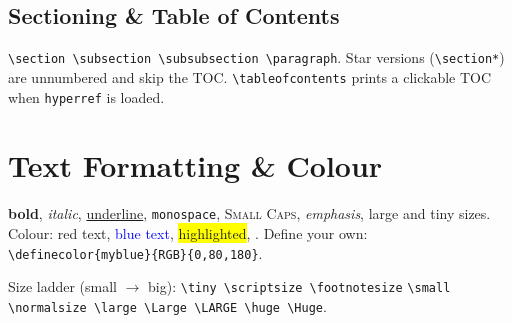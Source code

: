 \documentclass[11pt]{article}
\theoremstyle{plain}
\theoremstyle{definition}
\theoremstyle{remark}
\begin{document}
\subsection{Sectioning \& Table of Contents}
\verb|\section \subsection \subsubsection \paragraph|. Star versions
(\verb|\section*|) are unnumbered and skip the TOC. \verb|\tableofcontents|
prints a clickable TOC when \texttt{hyperref} is loaded.

\section{Text Formatting \& Colour}
\textbf{bold}, \textit{italic}, \underline{underline},
\texttt{monospace}, \textsc{Small Caps}, \emph{emphasis},
{\Large large} and {\tiny tiny} sizes.
Colour: {\color{red}red text}, \textcolor{blue}{blue text},
\colorbox{yellow}{highlighted}, .
Define your own: \verb|\definecolor{myblue}{RGB}{0,80,180}|.

Size ladder (small $\to$ big): \verb|\tiny \scriptsize \footnotesize|
\verb|\small \normalsize \large \Large \LARGE \huge \Huge|.

\end{document}

